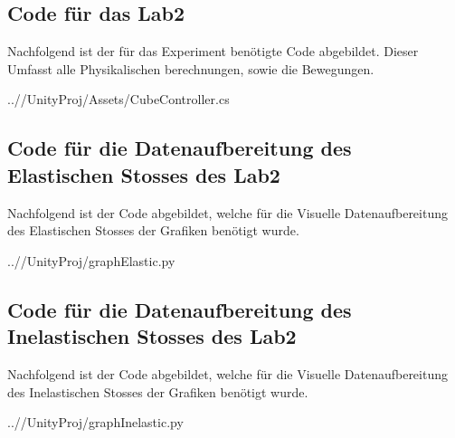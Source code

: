 \documentclass[../main.tex]{subfiles}
\begin{document}
    \subsection{Code für das Lab2}
    Nachfolgend ist der für das Experiment benötigte Code abgebildet.
    Dieser Umfasst alle Physikalischen berechnungen, sowie die Bewegungen.

%    
    \begin{lstinputlisting}[label={lst:CubeController}]
        {..//UnityProj/Assets/CubeController.cs}
    \end{lstinputlisting}

    \subsection{Code für die Datenaufbereitung des Elastischen Stosses des Lab2}
    Nachfolgend ist der Code abgebildet, welche für die Visuelle Datenaufbereitung des Elastischen Stosses
    der Grafiken benötigt wurde.
    \begin{lstinputlisting}[label={lst:Elastischen}]
    {..//UnityProj/graphElastic.py}
    \end{lstinputlisting}

    \subsection{Code für die Datenaufbereitung des Inelastischen Stosses des Lab2}
    Nachfolgend ist der Code abgebildet, welche für die Visuelle Datenaufbereitung des Inelastischen Stosses
    der Grafiken benötigt wurde.
    \begin{lstinputlisting}[label={lst:graphInelastic}]
        {..//UnityProj/graphInelastic.py}
    \end{lstinputlisting}
\end{document}
